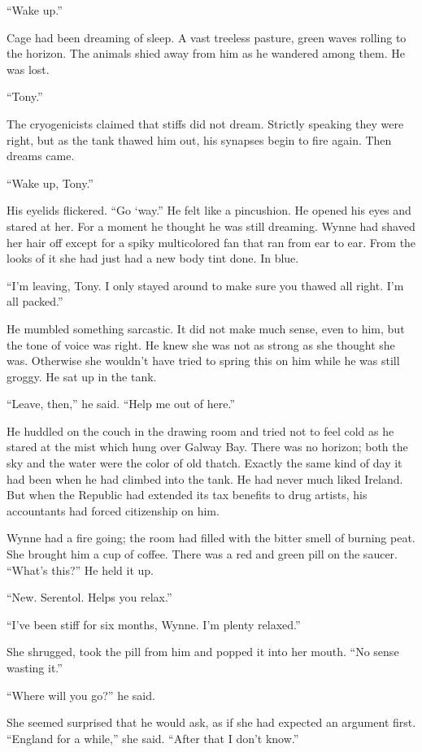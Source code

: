 “Wake up.”

Cage had been dreaming of sleep. A vast treeless pasture, green waves rolling to the horizon. The animals shied away from him as he wandered among them. He was lost.

“Tony.”

The cryogenicists claimed that stiffs did not dream. Strictly speaking they were right, but as the tank thawed him out, his synapses begin to fire again. Then dreams came.

“Wake up, Tony.”

His eyelids flickered. “Go ‘way.” He felt like a pincushion. He opened his eyes and stared at her. For a moment he thought he was still dreaming. Wynne had shaved her hair off except for a spiky multicolored fan that ran from ear to ear. From the looks of it she had just had a new body tint done. In blue.

“I’m leaving, Tony. I only stayed around to make sure you thawed all right. I’m all packed.”

He mumbled something sarcastic. It did not make much sense, even to him, but the tone of voice was right. He knew she was not as strong as she thought she was. Otherwise she wouldn’t have tried to spring this on him while he was still groggy. He sat up in the tank.

“Leave, then,” he said. “Help me out of here.”

He huddled on the couch in the drawing room and tried not to feel cold as he stared at the mist which hung over Galway Bay. There was no horizon; both the sky and the water were the color of old thatch. Exactly the same kind of day it had been when he had climbed into the tank. He had never much liked Ireland. But when the Republic had extended its tax benefits to drug artists, his accountants had forced citizenship on him.

Wynne had a fire going; the room had filled with the bitter smell of burning peat. She brought him a cup of coffee. There was a red and green pill on the saucer. “What’s this?” He held it up.

“New. Serentol. Helps you relax.”

“I’ve been stiff for six months, Wynne. I’m plenty relaxed.”

She shrugged, took the pill from him and popped it into her mouth. “No sense wasting it.”

“Where will you go?” he said.

She seemed surprised that he would ask, as if she had expected an argument first. “England for a while,” she said. “After that I don’t know.”

